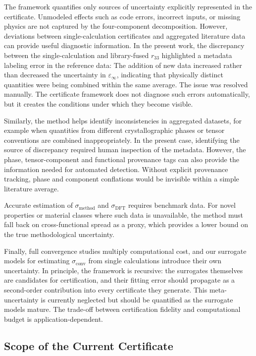 \documentclass[prb,twocolumn,superscriptaddress,amsmath,amssymb,longbibliography]{revtex4-2}
\newcommand{\conv}{\mathrm{conv}}
\newcommand{\meth}{\mathrm{method}}
\begin{document}
The framework quantifies only sources of uncertainty explicitly represented in the certificate. Unmodeled 
effects such as code errors, incorrect inputs, or missing physics are not 
captured by the four-component decomposition. However, deviations between 
single-calculation certificates and aggregated literature data can provide useful diagnostic information. In the present work,  the discrepancy between the single-calculation and 
library-fused $r_{33}$ highlighted a metadata labeling error in the reference data:  The addition of new data increased rather than decreased the uncertainty in $\varepsilon_\infty$, indicating that physically distinct quantities were being combined within the same average. The issue was resolved manually. The certificate framework does not diagnose such 
errors automatically, but it creates the conditions under which they 
become visible. 

Similarly, the method helps identify  inconsistencies in aggregated datasets, for example when quantities from different crystallographic phases or tensor conventions are combined inappropriately. In the present case, identifying the source of discrepancy required human inspection of the metadata. However, the phase, tensor-component and functional provenance tags can also provide the information needed for automated detection. Without explicit provenance tracking, phase and component conflations would be invisible within a simple literature average.

Accurate estimation of $\sigma_\meth$ and $\sigma_{\mathrm{DFT}}$ requires 
benchmark data. For novel properties or material classes where such data is 
unavailable, the method must fall back on cross-functional spread as a proxy, 
which provides a lower bound on the true methodological uncertainty.

Finally, full convergence studies multiply computational cost, and our surrogate 
models for estimating $\sigma_\conv$ from single calculations introduce their 
own uncertainty. In principle, the framework is recursive: the surrogates 
themselves are candidates for certification, and their fitting error should 
propagate as a second-order contribution into every certificate they generate. 
This meta-uncertainty is currently neglected but should be quantified as the 
surrogate models mature. The trade-off between certification fidelity and 
computational budget is application-dependent.

\subsection{Scope of the Current Certificate}
\end{document}
